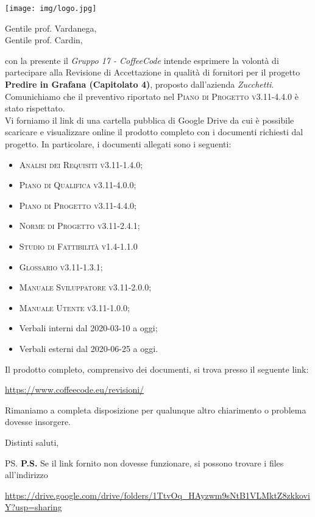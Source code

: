 \documentclass{letter}
\date{17 Luglio 2020}
\begin{document}
\begin{letter}{ }

\texttt{[image: img/logo.jpg]}

\opening{Gentile prof. Vardanega, \\
Gentile prof. Cardin,}

con la presente il \textit{Gruppo 17 - CoffeeCode} intende esprimere la volontà di partecipare alla Revisione di Accettazione in qualità di fornitori per il progetto 
\textbf{Predire in Grafana (Capitolato 4)}, proposto dall'azienda \textit{Zucchetti}. \\
Comunichiamo che il preventivo riportato nel \textsc{Piano di Progetto v3.11-4.4.0} è stato rispettato. \\
Vi forniamo il link di una cartella pubblica di Google Drive da cui è possibile scaricare e visualizzare online il prodotto completo con i documenti richiesti dal progetto. In particolare, i documenti allegati sono i seguenti:
\begin{itemize}
  \item \textsc{Analisi dei Requisiti v3.11-1.4.0};
  \item \textsc{Piano di Qualifica v3.11-4.0.0};
  \item \textsc{Piano di Progetto v3.11-4.4.0};
  \item \textsc{Norme di Progetto v3.11-2.4.1};
  \item \textsc{Studio di Fattibilità v1.4-1.1.0}
  \item \textsc{Glossario v3.11-1.3.1};
  \item \textsc{Manuale Sviluppatore v3.11-2.0.0};
  \item \textsc{Manuale Utente v3.11-1.0.0};
  \item Verbali interni dal 2020-03-10 a oggi;
  \item Verbali esterni dal 2020-06-25 a oggi.
\end{itemize}
\newpage
Il prodotto completo, comprensivo dei documenti, si trova presso il seguente link:
\begin{center}
  \centering
  \href{https://www.coffeecode.eu/revisioni/}{https://www.coffeecode.eu/revisioni/}
\end{center}

Rimaniamo a completa disposizione per qualunque altro chiarimento o problema dovesse insorgere.

\closing{Distinti saluti,}

\ps
\textbf{P.S.} Se il link fornito non dovesse funzionare, si possono trovare i files all'indirizzo
\begin{center}
	
	\href{https://drive.google.com/drive/folders/1TtvOq_HAyzwm9sNtB1VLMktZ8zkkoviY?usp=sharing}{https://drive.google.com/drive/folders/1TtvOq\_HAyzwm9sNtB1VLMktZ8zkkoviY?usp=sharing}
\end{center}

\end{letter}
\end{document}
